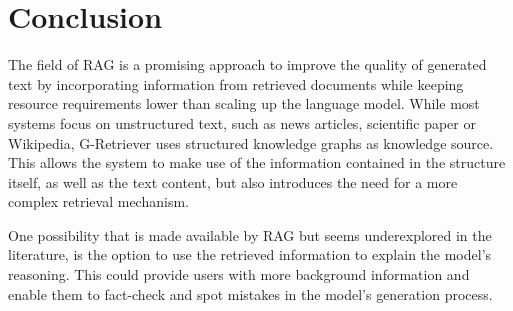 \section{Conclusion}

The field of RAG is a promising approach to improve the quality of generated text by incorporating information from retrieved documents while keeping resource requirements lower than scaling up the language model.
While most systems focus on unstructured text, such as news articles, scientific paper or Wikipedia, G-Retriever uses structured knowledge graphs as knowledge source.
This allows the system to make use of the information contained in the structure itself, as well as the text content, but also introduces the need for a more complex retrieval mechanism.

One possibility that is made available by RAG but seems underexplored in the literature, is the option to use the retrieved information to explain the model's reasoning.
This could provide users with more background information and enable them to fact-check and spot mistakes in the model's generation process.

